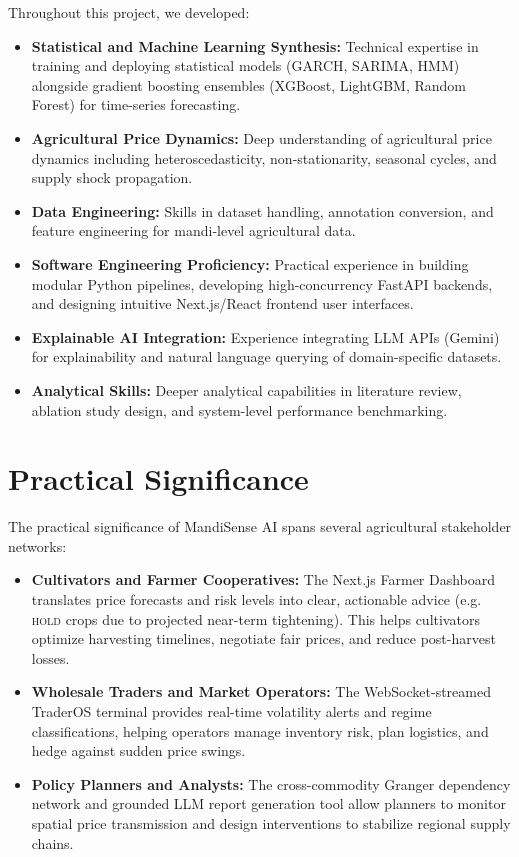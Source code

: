 \documentclass[12pt,a4paper]{report}
\theoremstyle{definition}
\theoremstyle{remark}
\begin{document}
Throughout this project, we developed:
\begin{itemize}
    \item \textbf{Statistical and Machine Learning Synthesis:} Technical expertise in training and deploying statistical models (GARCH, SARIMA, HMM) alongside gradient boosting ensembles (XGBoost, LightGBM, Random Forest) for time-series forecasting.
    \item \textbf{Agricultural Price Dynamics:} Deep understanding of agricultural price dynamics including heteroscedasticity, non-stationarity, seasonal cycles, and supply shock propagation.
    \item \textbf{Data Engineering:} Skills in dataset handling, annotation conversion, and feature engineering for mandi-level agricultural data.
    \item \textbf{Software Engineering Proficiency:} Practical experience in building modular Python pipelines, developing high-concurrency FastAPI backends, and designing intuitive Next.js/React frontend user interfaces.
    \item \textbf{Explainable AI Integration:} Experience integrating LLM APIs (Gemini) for explainability and natural language querying of domain-specific datasets.
    \item \textbf{Analytical Skills:} Deeper analytical capabilities in literature review, ablation study design, and system-level performance benchmarking.
\end{itemize}

\section{Practical Significance}

The practical significance of MandiSense AI spans several agricultural stakeholder networks:
\begin{itemize}
    \item \textbf{Cultivators and Farmer Cooperatives:} The Next.js Farmer Dashboard translates price forecasts and risk levels into clear, actionable advice (e.g. \textsc{hold} crops due to projected near-term tightening). This helps cultivators optimize harvesting timelines, negotiate fair prices, and reduce post-harvest losses.
    \item \textbf{Wholesale Traders and Market Operators:} The WebSocket-streamed TraderOS terminal provides real-time volatility alerts and regime classifications, helping operators manage inventory risk, plan logistics, and hedge against sudden price swings.
    \item \textbf{Policy Planners and Analysts:} The cross-commodity Granger dependency network and grounded LLM report generation tool allow planners to monitor spatial price transmission and design interventions to stabilize regional supply chains.
\end{itemize}
\end{document}
